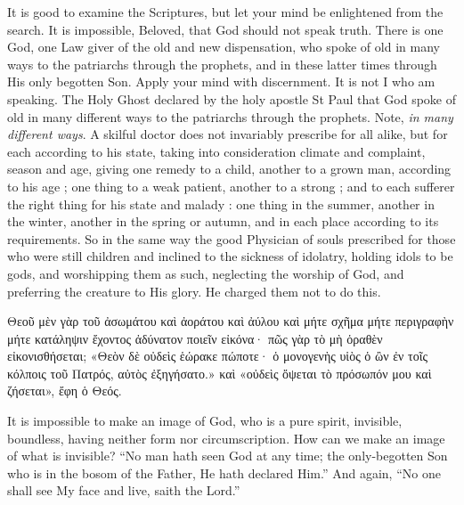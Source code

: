 \documentclass[10pt]{book}
\newcommand{\switchGreek}[1][]{\selectlanguage{polutonikogreek} \switchcolumn*[#1]}
\newcommand{\switchEnglish}{\selectlanguage{english} \switchcolumn}
\begin{document}
\begin{paracol}{2}
It is good to examine the Scriptures, but 
let your mind be enlightened from the search. 
It is impossible, Beloved, that God should not 
speak truth. There is one God, one Law 
giver of the old and new dispensation, who 
spoke of old in many ways to the patriarchs 
through the prophets, and in these latter times 
through His only begotten Son. Apply your 
mind with discernment. It is not I who am 
speaking. The Holy Ghost declared by the 
holy apostle St Paul that God spoke of old 
in many different ways to the patriarchs 
through the prophets. Note, \emph{in many different ways}.
A skilful doctor does not invariably 
prescribe for all alike, but for each according 
to his state, taking into consideration climate 
and complaint, season and age, giving one 
remedy to a child, another to a grown man, 
according to his age ; one thing to a weak 
patient, another to a strong ; and to each 
sufferer the right thing for his state and 
malady : one thing in the summer, another in 
the winter, another in the spring or autumn, 
and in each place according to its requirements. 
So in the same way the good Physician of 
souls prescribed for those who were still 
children and inclined to the sickness of idolatry, 
holding idols to be gods, and worshipping 
them as such, neglecting the worship of God, 
and preferring the creature to His glory. 
He charged them not to do this. 

\switchGreek

Θεοῦ μὲν γὰρ τοῦ ἀσωμάτου καὶ ἀοράτου καὶ ἀύλου
καὶ μήτε σχῆμα μήτε περιγραφὴν μήτε
κατάληψιν ἔχοντος ἀδύνατον ποιεῖν εἰκόνα· πῶς γὰρ τὸ μὴ ὁραθὲν
εἰκονισθήσεται; «Θεὸν δὲ οὐδεὶς ἑώρακε πώποτε· ὁ μονογενὴς υἱὸς ὁ ὢν ἐν τοῖς
κόλποις τοῦ Πατρός, αὐτὸς ἐξηγήσατο.» καὶ «οὐδεὶς ὄψεται τὸ πρόσωπόν μου καὶ
ζήσεται», ἔφη ὁ Θεός.

\switchEnglish

It is impossible to make an image of God, 
who is a pure spirit, invisible, boundless, having 
neither form nor circumscription. How can 
we make an image of what is invisible? ``No 
man hath seen God at any time; the only-begotten
Son who is in the bosom of the 
Father, He hath declared Him.'' And again, 
``No one shall see My face and live, saith the Lord.'' 

\switchGreek


\end{paracol}
\end{document}
